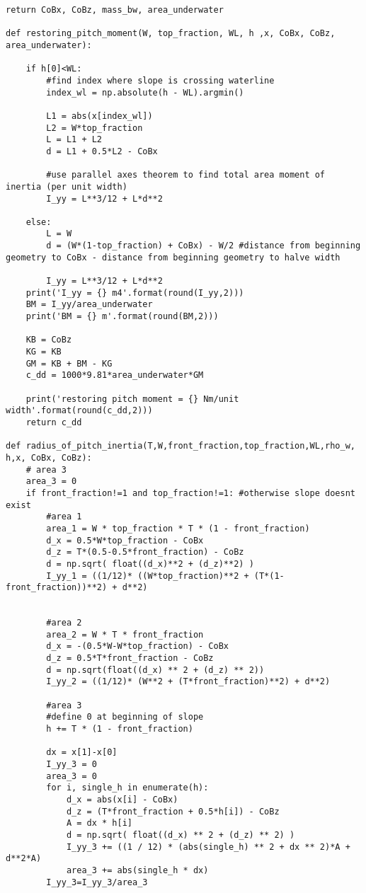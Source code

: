 \begin{mdframed}[backgroundcolor=light-gray, roundcorner=10pt,leftmargin=1, rightmargin=1, innerleftmargin=0, innertopmargin=7,innerbottommargin=0, outerlinewidth=1, linecolor=light-gray]
\begin{lstlisting}[linewidth=\columnwidth,caption=Functions used in setting up simulations ., label=script:setting up simulations]
    return CoBx, CoBz, mass_bw, area_underwater

def restoring_pitch_moment(W, top_fraction, WL, h ,x, CoBx, CoBz, area_underwater):

    if h[0]<WL:
        #find index where slope is crossing waterline
        index_wl = np.absolute(h - WL).argmin()

        L1 = abs(x[index_wl])
        L2 = W*top_fraction
        L = L1 + L2
        d = L1 + 0.5*L2 - CoBx

        #use parallel axes theorem to find total area moment of inertia (per unit width)
        I_yy = L**3/12 + L*d**2

    else:
        L = W
        d = (W*(1-top_fraction) + CoBx) - W/2 #distance from beginning geometry to CoBx - distance from beginning geometry to halve width

        I_yy = L**3/12 + L*d**2
    print('I_yy = {} m4'.format(round(I_yy,2)))
    BM = I_yy/area_underwater
    print('BM = {} m'.format(round(BM,2)))

    KB = CoBz
    KG = KB
    GM = KB + BM - KG
    c_dd = 1000*9.81*area_underwater*GM

    print('restoring pitch moment = {} Nm/unit width'.format(round(c_dd,2)))
    return c_dd

def radius_of_pitch_inertia(T,W,front_fraction,top_fraction,WL,rho_w, h,x, CoBx, CoBz):
    # area 3
    area_3 = 0
    if front_fraction!=1 and top_fraction!=1: #otherwise slope doesnt exist
        #area 1
        area_1 = W * top_fraction * T * (1 - front_fraction)
        d_x = 0.5*W*top_fraction - CoBx
        d_z = T*(0.5-0.5*front_fraction) - CoBz
        d = np.sqrt( float((d_x)**2 + (d_z)**2) )
        I_yy_1 = ((1/12)* ((W*top_fraction)**2 + (T*(1-front_fraction))**2) + d**2)


        #area 2
        area_2 = W * T * front_fraction
        d_x = -(0.5*W-W*top_fraction) - CoBx
        d_z = 0.5*T*front_fraction - CoBz
        d = np.sqrt(float((d_x) ** 2 + (d_z) ** 2))
        I_yy_2 = ((1/12)* (W**2 + (T*front_fraction)**2) + d**2)

        #area 3
        #define 0 at beginning of slope
        h += T * (1 - front_fraction)

        dx = x[1]-x[0]
        I_yy_3 = 0
        area_3 = 0
        for i, single_h in enumerate(h):
            d_x = abs(x[i] - CoBx)
            d_z = (T*front_fraction + 0.5*h[i]) - CoBz
            A = dx * h[i]
            d = np.sqrt( float((d_x) ** 2 + (d_z) ** 2) )
            I_yy_3 += ((1 / 12) * (abs(single_h) ** 2 + dx ** 2)*A + d**2*A)
            area_3 += abs(single_h * dx)
        I_yy_3=I_yy_3/area_3


\end{lstlisting}
\end{mdframed}
